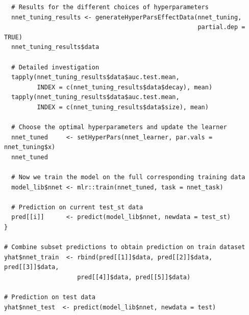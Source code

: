 \documentclass[12pt]{article}
\begin{document}
\begin{lstlisting}
  # Results for the different choices of hyperparameters
  nnet_tuning_results <- generateHyperParsEffectData(nnet_tuning, 
                                                     partial.dep = TRUE)
  nnet_tuning_results$data
  
  # Detailed investigation
  tapply(nnet_tuning_results$data$auc.test.mean, 
         INDEX = c(nnet_tuning_results$data$decay), mean)
  tapply(nnet_tuning_results$data$auc.test.mean, 
         INDEX = c(nnet_tuning_results$data$size), mean)
  
  # Choose the optimal hyperparameters and update the learner
  nnet_tuned     <- setHyperPars(nnet_learner, par.vals = nnet_tuning$x)
  nnet_tuned
  
  # Now we train the model on the full corresponding training data 
  model_lib$nnet <- mlr::train(nnet_tuned, task = nnet_task)
  
  # Prediction on current test_st data
  pred[[i]]      <- predict(model_lib$nnet, newdata = test_st)
}

# Combine subset predictions to obtain prediction on train dataset
yhat$nnet_train  <- rbind(pred[[1]]$data, pred[[2]]$data, pred[[3]]$data,
                    pred[[4]]$data, pred[[5]]$data)

# Prediction on test data 
yhat$nnet_test  <- predict(model_lib$nnet, newdata = test)
\end{lstlisting}
\end{document}
